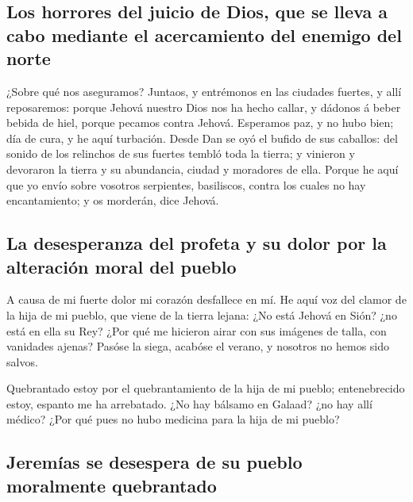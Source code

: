 \hypertarget{los-horrores-del-juicio-de-dios-que-se-lleva-a-cabo-mediante-el-acercamiento-del-enemigo-del-norte}{%
\subsection{Los horrores del juicio de Dios, que se lleva a cabo
mediante el acercamiento del enemigo del
norte}\label{los-horrores-del-juicio-de-dios-que-se-lleva-a-cabo-mediante-el-acercamiento-del-enemigo-del-norte}}

 ¿Sobre qué nos aseguramos? Juntaos, y entrémonos en las
ciudades fuertes, y allí reposaremos: porque Jehová nuestro Dios nos ha
hecho callar, y dádonos á beber bebida de hiel, porque pecamos contra
Jehová.  Esperamos paz, y no hubo bien; día de cura, y he
aquí turbación.  Desde Dan se oyó el bufido de sus
caballos: del sonido de los relinchos de sus fuertes tembló toda la
tierra; y vinieron y devoraron la tierra y su abundancia, ciudad y
moradores de ella.  Porque he aquí que yo envío sobre
vosotros serpientes, basiliscos, contra los cuales no hay encantamiento;
y os morderán, dice Jehová.

\hypertarget{la-desesperanza-del-profeta-y-su-dolor-por-la-alteraciuxf3n-moral-del-pueblo}{%
\subsection{La desesperanza del profeta y su dolor por la alteración
moral del
pueblo}\label{la-desesperanza-del-profeta-y-su-dolor-por-la-alteraciuxf3n-moral-del-pueblo}}

 A causa de mi fuerte dolor mi corazón desfallece en mí.
 He aquí voz del clamor de la hija de mi pueblo, que viene
de la tierra lejana: ¿No está Jehová en Sión? ¿no está en ella su Rey?
¿Por qué me hicieron airar con sus imágenes de talla, con vanidades
ajenas?  Pasóse la siega, acabóse el verano, y nosotros no
hemos sido salvos.

 Quebrantado estoy por el quebrantamiento de la hija de mi
pueblo; entenebrecido estoy, espanto me ha arrebatado.  ¿No
hay bálsamo en Galaad? ¿no hay allí médico? ¿Por qué pues no hubo
medicina para la hija de mi pueblo?

\hypertarget{jeremuxedas-se-desespera-de-su-pueblo-moralmente-quebrantado}{%
\subsection{Jeremías se desespera de su pueblo moralmente
quebrantado}\label{jeremuxedas-se-desespera-de-su-pueblo-moralmente-quebrantado}}

